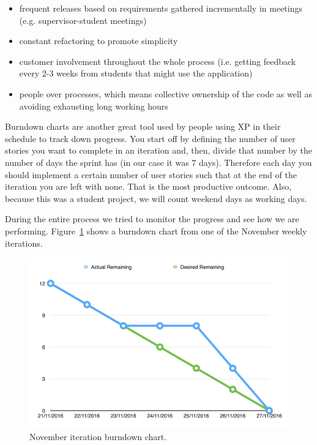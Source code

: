 \documentclass{l4proj}
\begin{document}
\begin{itemize}
\item frequent releases based on requirements gathered incrementally in meetings (e.g. supervisor-student meetings)
\item constant refactoring to promote simplicity
\item customer involvement throughout the whole process (i.e. getting feedback every 2-3 weeks from students that might use the application)
\item people over processes, which means collective ownership of the code as well as avoiding exhausting long working hours
\end{itemize}

Burndown charts are another great tool used by people using XP in their schedule to track down progress. You start off by defining the number of user stories you want to complete in an iteration and, then, divide that number by the number of days the sprint has (in our case it was 7 days). Therefore each day you should implement a certain number of user stories such that at the end of the iteration you are left with none. That is the most productive outcome. Also, because this was a student project, we will count weekend days as working days.

During the entire process we tried to monitor the progress and see how we are performing.
Figure~\ref{fig:burndown-november} shows a burndown chart from one of the November weekly iterations.

\begin{figure}[!ht]
\centering
\includegraphics[scale=0.6]{burndown}
\caption{November iteration burndown chart.}
\label{fig:burndown-november}
\end{figure}
\end{document}
